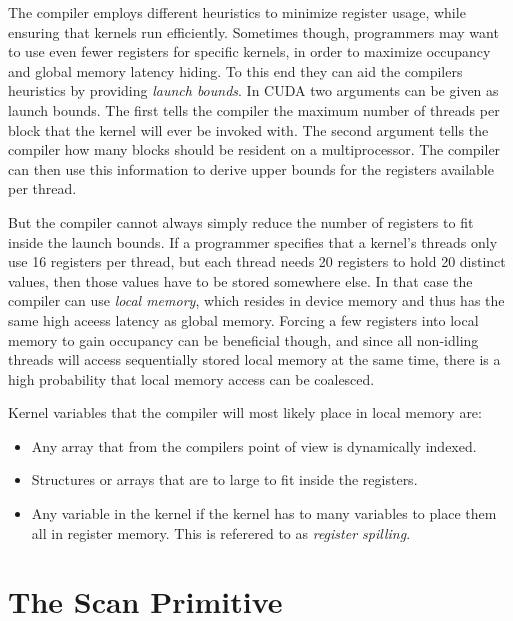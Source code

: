 
The compiler employs different heuristics to minimize register usage, while
ensuring that kernels run efficiently. Sometimes though, programmers may want to
use even fewer registers for specific kernels, in order to maximize occupancy
and global memory latency hiding. To this end they can aid the compilers
heuristics by providing \textit{launch bounds}. In CUDA two arguments can be
given as launch bounds. The first tells the compiler the maximum number of
threads per block that the kernel will ever be invoked with. The second argument
tells the compiler how many blocks should be resident on a multiprocessor. The
compiler can then use this information to derive upper bounds for the registers
available per thread.





But the compiler cannot always simply reduce the number of registers to fit
inside the launch bounds. If a programmer specifies that a kernel's threads only
use 16 registers per thread, but each thread needs 20 registers to hold 20
distinct values, then those values have to be stored somewhere else. In that
case the compiler can use \textit{local memory}, which resides in device memory
and thus has the same high aceess latency as global memory. Forcing a few
registers into local memory to gain occupancy can be beneficial though, and
since all non-idling threads will access sequentially stored local memory at the
same time, there is a high probability that local memory access can be
coalesced.

Kernel variables that the compiler will most likely place in local
memory are:

\begin{itemize}
  \item Any array that from the compilers point of view is dynamically
    indexed.
  \item Structures or arrays that are to large to fit inside the
    registers.
  \item Any variable in the kernel if the kernel has to many variables
    to place them all in register memory. This is referered to as
    \textit{register spilling}.
\end{itemize}



\section{The Scan Primitive}\label{sec:GPUprims}

